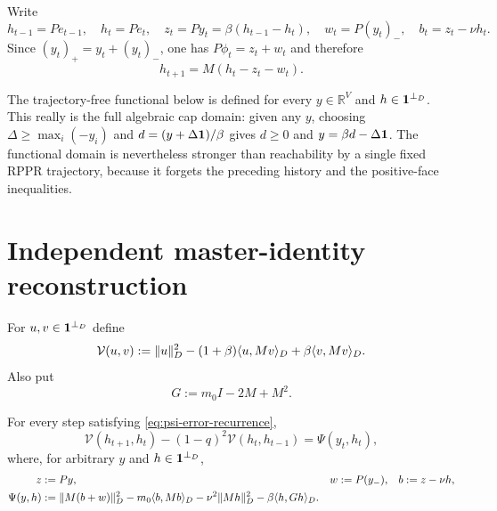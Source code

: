 \documentclass[11pt]{article}
\begin{document}
Write
\begin{equation}
 h_{t-1}=Pe_{t-1},\quad h_t=Pe_t,\quad
 z_t=Py_t=\beta(h_{t-1}-h_t),\quad
 w_t=P(y_t)_-,\quad b_t=z_t-\nu h_t.
 \label{eq:psi-high-variables}
\end{equation}
Since $(y_t)_+=y_t+(y_t)_-$, one has
$P\phi_t=z_t+w_t$ and therefore
\begin{equation}
 h_{t+1}=M(h_t-z_t-w_t).
 \label{eq:psi-high-recurrence}
\end{equation}

The trajectory-free functional below is defined for every
$y\in\mathbb R^V$ and $h\in\mathbf{1}^{\perp_D}$.  This really is the full
algebraic cap domain: given any $y$, choosing
$\Delta\geq\max_i(-y_i)$ and $d=(y+\Delta\mathbf{1})/\beta$ gives
$d\geq0$ and $y=\beta d-\Delta\mathbf{1}$.  The functional domain is nevertheless
stronger than reachability by a single fixed RPPR trajectory, because it
forgets the preceding history and the positive-face inequalities.

\section{Independent master-identity reconstruction}

For $u,v\in\mathbf{1}^{\perp_D}$ define
\begin{equation}
 \mathcal V(u,v)
 :=\lVert u\rVert_D^2-(1+\beta)\langle u,Mv\rangle_D
     +\beta\langle v,Mv\rangle_D.
 \label{eq:psi-lyapunov}
\end{equation}
Also put
\begin{equation}
 G:=m_0I-2M+M^2.
 \label{eq:psi-g-operator}
\end{equation}

\begin{lemma}
\label{lem:psi-master-identity}
For every step satisfying \cref{eq:psi-error-recurrence},
\begin{equation}
 \mathcal V(h_{t+1},h_t)-(1-q)^2\mathcal V(h_t,h_{t-1})
 =\Psi(y_t,h_t),
 \label{eq:psi-master-identity}
\end{equation}
where, for arbitrary $y$ and $h\in\mathbf{1}^{\perp_D}$,
\begin{align}
 z&:=Py,& w&:=P(y_-),& b&:=z-\nu h,\notag\\
 \Psi(y,h)
 &:=\lVert M(b+w)\rVert_D^2-m_0\langle b,Mb\rangle_D
       -\nu^2\lVert Mh\rVert_D^2-\beta\langle h,Gh\rangle_D.
 \label{eq:psi-master-form}
\end{align}
\end{lemma}
\end{document}
